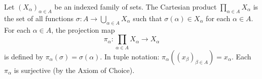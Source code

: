 Let $(X_{\alpha})_{\alpha \in A}$ be an indexed family of sets. The Cartesian product $\prod_{\alpha \in A} X_{\alpha}$ is the set of all functions $\sigma: A \to \bigcup_{\alpha \in A} X_{\alpha}$ such that $\sigma(\alpha) \in X_{\alpha}$ for each $\alpha \in A$. For each $\alpha \in A$, the projection map
$$\pi_{\alpha}: \prod_{\alpha \in A} X_{\alpha} \to X_{\alpha}$$
is defined by $\pi_{\alpha}(\sigma) = \sigma(\alpha)$. In tuple notation: $\pi_{\alpha}((x_{\beta})_{\beta \in A}) = x_{\alpha}$. Each $\pi_{\alpha}$ is surjective (by the Axiom of Choice).
